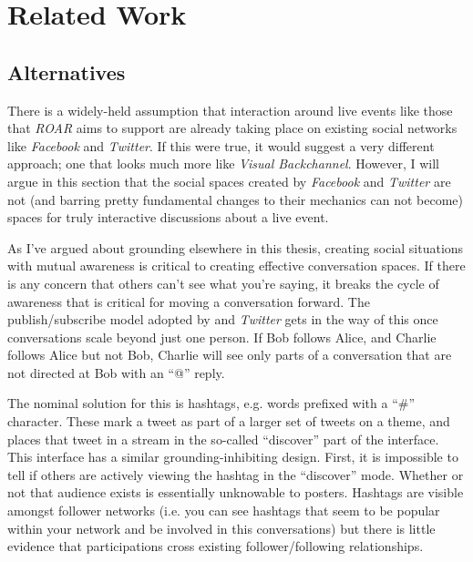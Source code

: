 \section{Related Work}

%

\subsection{Alternatives}

There is a widely-held assumption that interaction around live events like those that \emph{ROAR} aims to support are already taking place on existing social networks like \emph{Facebook} and \emph{Twitter}. If this were true, it would suggest a very different approach; one that looks much more like \emph{Visual Backchannel}. However, I will argue in this section that the social spaces created by \emph{Facebook} and \emph{Twitter} are not (and barring pretty fundamental changes to their mechanics can not become) spaces for truly interactive discussions about a live event.

As I've argued about grounding elsewhere in this thesis, creating social situations with mutual awareness is critical to creating effective conversation spaces. If there is any concern that others can't see what you're saying, it breaks the cycle of awareness that is critical for moving a conversation forward. The publish/subscribe model adopted by and \emph{Twitter} gets in the way of this once conversations scale beyond just one person. If Bob follows Alice, and Charlie follows Alice but not Bob, Charlie will see only parts of a conversation that are not directed at Bob with an ``@'' reply. 

The nominal solution for this is hashtags, e.g. words prefixed with a ``\#'' character. These mark a tweet as part of a larger set of tweets on a theme, and places that tweet in a stream in the so-called ``discover'' part of the interface. This interface has a similar grounding-inhibiting design. First, it is impossible to tell if others are actively viewing the hashtag in the ``discover'' mode. Whether or not that audience exists is essentially unknowable to posters. Hashtags are visible amongst follower networks (i.e. you can see hashtags that seem to be popular within your network and be involved in this conversations) but there is little evidence that participations cross existing follower/following relationships.

